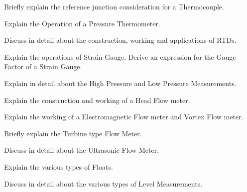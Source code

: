 \markB

\newpage \again

\partC

\item \iitem Briefly explain the reference junction consideration for a Thermocouple. 
\item Explain the Operation of a Pressure Thermometer.  
\ene
\Or
\item Discuss in detail about the construction, working and applications of RTDs.

\item Explain the operations of Strain Gauge. Derive an expression for the Gauge Factor of a Strain Gauge.
\Or
\item Explain in detail about the High Pressure and Low Pressure Measurements.

\item Explain the construction and working of a Head Flow meter.
\Or
\item \iitem Explain the working of a Electromagnetic Flow meter and Vortex Flow meter. 
\item Briefly explain the Turbine type Flow Meter.  
\ene

\item Discuss in detail about the Ultrasonic Flow Meter.
\Or
\item \iitem Explain the various types of Floats. 
\item Discuss in detail about the various types of Level Measurements. 
\ene

\markC
\ene
